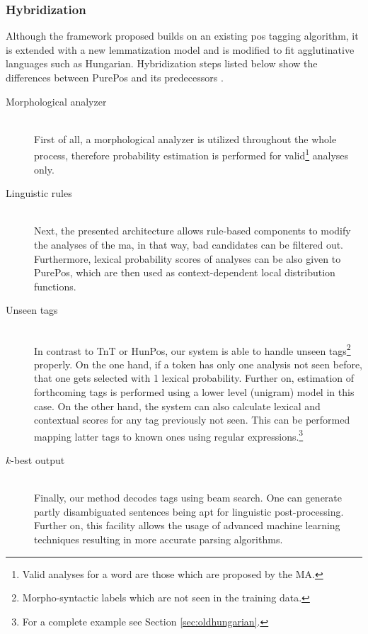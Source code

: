 \subsubsection{Hybridization}

Although the framework proposed builds on an existing \gls{pos} tagging algorithm, it is extended with a new lemmatization model and is modified to fit agglutinative languages such as Hungarian. 
Hybridization steps listed below show the differences between PurePos and its predecessors \cite{Brants2000,Halacsy2007}.

\begin{description}
  \item[Morphological analyzer] \hfill \\
  First of all, a morphological analyzer is utilized throughout the whole process, therefore probability estimation is performed for valid\footnote{Valid analyses for a word are those which are proposed by the MA.} analyses only.
  \item[Linguistic rules] \hfill \\
  Next, the presented architecture allows rule-based components to modify the analyses of the \acrshort{ma}, in that way, bad candidates can be filtered out. Furthermore, lexical probability scores of analyses can be also given to PurePos, which are then used as context-dependent local distribution functions. 
  \item[Unseen tags] \hfill \\ 
  In contrast to TnT or HunPos, our system is able to handle unseen tags\footnote{Morpho-syntactic labels which are not seen in the training data.} properly. On the one hand, if a token has only one analysis not seen before, that one gets selected with 1 lexical probability. Further on, estimation of forthcoming tags is performed using a lower level (unigram) model in this case. On the other hand, the system can also calculate lexical and contextual scores for any tag previously not seen. This can be performed mapping latter tags to known ones using regular expressions.\footnote{For a complete example see Section \ref{sec:oldhungarian}.}
  \item[$k$-best output] \hfill \\
  Finally, our method decodes tags using beam search. One can generate partly disambiguated sentences being apt for linguistic post-processing. Further on, this facility allows the usage of advanced machine learning techniques resulting in more accurate parsing algorithms.
\end{description}


